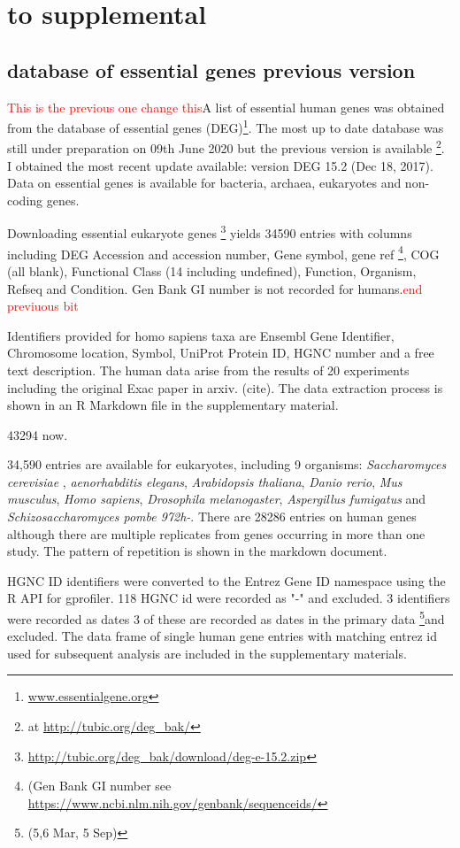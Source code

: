 \section{to supplemental}
\subsection{database of essential genes previous version}
  
\textcolor{red}{This is the previous one change this}A list of essential human genes was obtained from the database of essential genes (DEG)\cite{luo2014deg}\footnote{\url{www.essentialgene.org}}. The most up to date database was still under preparation on 09th June 2020 but the previous version is available \footnote{at \url{ http://tubic.org/deg_bak/}}. I obtained the most recent update available: version DEG 15.2 (Dec 18, 2017). Data on essential genes is available for bacteria, archaea, eukaryotes and non-coding genes.
 
  Downloading essential eukaryote genes \footnote{\url{http://tubic.org/deg_bak/download/deg-e-15.2.zip}} yields 34590 entries with columns including DEG Accession and  accession number, Gene symbol, gene ref \footnote{(Gen Bank GI number see \url{https://www.ncbi.nlm.nih.gov/genbank/sequenceids/}}, COG (all blank), Functional Class (14 including undefined), Function, Organism, Refseq and Condition. Gen Bank GI number is not recorded for humans.\textcolor{red}{end previuous bit}
  
Identifiers provided for homo sapiens taxa are Ensembl Gene Identifier, Chromosome location, Symbol, UniProt Protein ID, HGNC number and a free text description. The human data arise from the results of 20 experiments including the original Exac paper in arxiv. (cite). The data extraction process is shown in an R Markdown file in the supplementary material. 

43294 now.

34,590 entries are available for eukaryotes, including 9 organisms: \textit{Saccharomyces cerevisiae}   , \textit{aenorhabditis elegans}, \textit{Arabidopsis thaliana}, \textit{Danio rerio}, \textit{Mus musculus}, \textit{Homo sapiens}, \textit{Drosophila melanogaster}, \textit{Aspergillus fumigatus} and \textit{Schizosaccharomyces pombe 972h-}. There are 28286  entries on human genes although there are multiple replicates from genes occurring in more than one study. The pattern of repetition is  shown in the markdown document. 

HGNC ID identifiers were converted to the Entrez Gene ID namespace using the R API for gprofiler. 118 HGNC id were recorded as "-" and excluded. 3 identifiers were recorded as dates  3 of these are recorded as dates in the primary data \footnote{(5,6 Mar, 5 Sep)}and excluded. The data frame of single human gene entries with matching entrez id used for subsequent analysis are included in the supplementary materials. 
 


